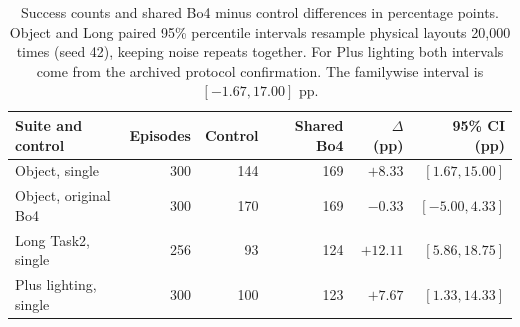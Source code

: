 \begin{table}[tb]
\centering\small
\caption{Success counts and shared Bo4 minus control differences in percentage points. Object and Long paired 95\% percentile intervals resample physical layouts 20,000 times (seed 42), keeping noise repeats together. For Plus lighting both intervals come from the archived protocol confirmation. The familywise interval is $[-1.67, 17.00]$ pp.}
\label{tab:closed-loop}
\begin{tabular}{@{}lrrrrr@{}}
\toprule
Suite and control & Episodes & Control & Shared Bo4 & $\Delta$ (pp) & 95\% CI (pp) \\
\midrule
Object, single & 300 & 144 & 169 & $+8.33$ & $[1.67, 15.00]$ \\
Object, original Bo4 & 300 & 170 & 169 & $-0.33$ & $[-5.00, 4.33]$ \\
Long Task2, single & 256 & 93 & 124 & $+12.11$ & $[5.86, 18.75]$ \\
Plus lighting, single & 300 & 100 & 123 & $+7.67$ & $[1.33, 14.33]$ \\
\bottomrule
\end{tabular}
\end{table}
